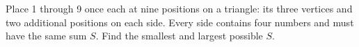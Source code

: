 Place 1 through 9 once each at nine positions on a triangle: its three vertices and two additional positions on each side. Every side contains four numbers and must have the same sum $S$. Find the smallest and largest possible $S$.
